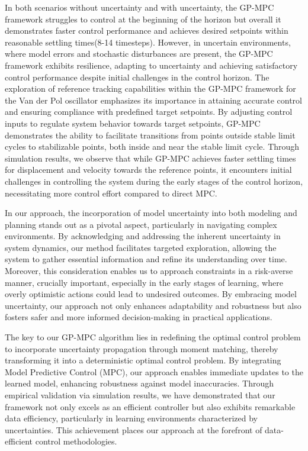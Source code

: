 In both scenarios without uncertainty and with uncertainty, the GP-MPC framework struggles to control at the beginning of the horizon but overall it demonstrates faster control performance and achieves desired setpoints within reasonable settling times(8-14 timesteps). However, in uncertain environments, where model errors and stochastic disturbances are present, the GP-MPC framework exhibits resilience, adapting to uncertainty and achieving satisfactory control performance despite initial challenges in the control horizon. The exploration of reference tracking capabilities within the GP-MPC framework for the Van der Pol oscillator emphasizes its importance in attaining accurate control and ensuring compliance with predefined target setpoints. By adjusting control inputs to regulate system behavior towards target setpoints, GP-MPC demonstrates the ability to facilitate transitions from points outside stable limit cycles to stabilizable points, both inside and near the stable limit cycle. Through simulation results, we observe that while GP-MPC achieves faster settling times for displacement and velocity towards the reference points, it encounters initial challenges in controlling the system during the early stages of the control horizon, necessitating more control effort compared to direct MPC.

In our approach, the incorporation of model uncertainty into both modeling and planning stands out as a pivotal aspect, particularly in navigating complex environments. By acknowledging and addressing the inherent uncertainty in system dynamics, our method facilitates targeted exploration, allowing the system to gather essential information and refine its understanding over time. Moreover, this consideration enables us to approach constraints in a risk-averse manner, crucially important, especially in the early stages of learning, where overly optimistic actions could lead to undesired outcomes. By embracing model uncertainty, our approach not only enhances adaptability and robustness but also fosters safer and more informed decision-making in practical applications.

The key to our GP-MPC algorithm lies in redefining the optimal control problem to incorporate uncertainty propagation through moment matching, thereby transforming it into a deterministic optimal control problem. By integrating Model Predictive Control (MPC), our approach enables immediate updates to the learned model, enhancing robustness against model inaccuracies. Through empirical validation via simulation results, we have demonstrated that our framework not only excels as an efficient controller but also exhibits remarkable data efficiency, particularly in learning environments characterized by uncertainties. This achievement places our approach at the forefront of data-efficient control methodologies.


